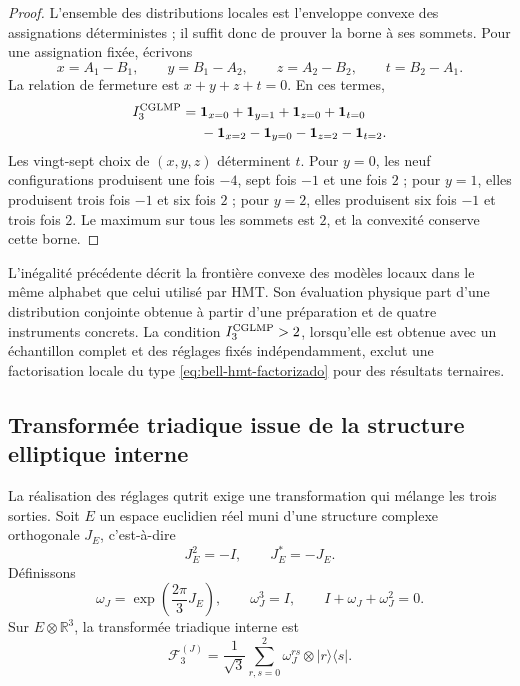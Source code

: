 \begin{proof}
L’ensemble des distributions locales est l’enveloppe convexe des assignations déterministes ; il suffit donc de prouver la borne à ses sommets. Pour une assignation fixée, écrivons
\[
 x=A_1-B_1,\qquad y=B_1-A_2,\qquad
 z=A_2-B_2,\qquad t=B_2-A_1.
\]
La relation de fermeture est \(x+y+z+t=0\). En ces termes,
\[
\begin{aligned}
 I_3^{\rm CGLMP}={}&
 \mathbf1_{x=0}+\mathbf1_{y=1}
 +\mathbf1_{z=0}+\mathbf1_{t=0}\\
 &-\mathbf1_{x=2}-\mathbf1_{y=0}
 -\mathbf1_{z=2}-\mathbf1_{t=2}.
\end{aligned}
\]
Les vingt-sept choix de \((x,y,z)\) déterminent \(t\). Pour \(y=0\), les neuf configurations produisent une fois \(-4\), sept fois \(-1\) et une fois \(2\) ; pour \(y=1\), elles produisent trois fois \(-1\) et six fois \(2\) ; pour \(y=2\), elles produisent six fois \(-1\) et trois fois \(2\). Le maximum sur tous les sommets est \(2\), et la convexité conserve cette borne.
\end{proof}

L’inégalité précédente décrit la frontière convexe des modèles locaux dans le même alphabet que celui utilisé par HMT. Son évaluation physique part d’une distribution conjointe obtenue à partir d’une préparation et de quatre instruments concrets. La condition \(I_3^{\rm CGLMP}>2\), lorsqu’elle est obtenue avec un échantillon complet et des réglages fixés indépendamment, exclut une factorisation locale du type \eqref{eq:bell-hmt-factorizado} pour des résultats ternaires.

\subsection{Transformée triadique issue de la structure elliptique interne}

La réalisation des réglages qutrit exige une transformation qui mélange les trois sorties. Soit \(E\) un espace euclidien réel muni d’une structure complexe orthogonale \(J_E\), c’est-à-dire
\[
 J_E^2=-I,
 \qquad
 J_E^{\!*}=-J_E.
\]
Définissons
\[
 \omega_J=\exp\!\left(\frac{2\pi}{3}J_E\right),
 \qquad
 \omega_J^3=I,
 \qquad
 I+\omega_J+\omega_J^2=0.
\]
Sur \(E\otimes\mathbb R^3\), la transformée triadique interne est
\begin{equation}
 \mathcal F_3^{(J)}
 =\frac1{\sqrt3}\sum_{r,s=0}^{2}
   \omega_J^{rs}\otimes|r\rangle\langle s|.
 \label{eq:fourier-triadica-interna}
\end{equation}

